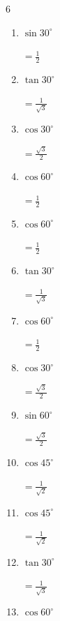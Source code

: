 \begin{multicols}{6}
\begin{enumerate}
  \item $\displaystyle \sin{30^\circ}$

        $\displaystyle =\frac{1}{2}$

  \item $\displaystyle \tan{30^\circ}$

        $\displaystyle =\frac{1}{\sqrt{3}}$

  \item $\displaystyle \cos{30^\circ}$

        $\displaystyle =\frac{\sqrt{3}}{2}$

  \item $\displaystyle \cos{60^\circ}$

        $\displaystyle =\frac{1}{2}$

\columnbreak %

  \item $\displaystyle \cos{60^\circ}$

        $\displaystyle =\frac{1}{2}$

  \item $\displaystyle \tan{30^\circ}$

        $\displaystyle =\frac{1}{\sqrt{3}}$

  \item $\displaystyle \cos{60^\circ}$

        $\displaystyle =\frac{1}{2}$

  \item $\displaystyle \cos{30^\circ}$

        $\displaystyle =\frac{\sqrt{3}}{2}$

  \item $\displaystyle \sin{60^\circ}$

        $\displaystyle =\frac{\sqrt{3}}{2}$

  \item $\displaystyle \cos{45^\circ}$

        $\displaystyle =\frac{1}{\sqrt{2}}$

  \item $\displaystyle \cos{45^\circ}$

        $\displaystyle =\frac{1}{\sqrt{2}}$

  \item $\displaystyle \tan{30^\circ}$

        $\displaystyle =\frac{1}{\sqrt{3}}$

  \item $\displaystyle \cos{60^\circ}$


\end{enumerate}
\end{multicols}
